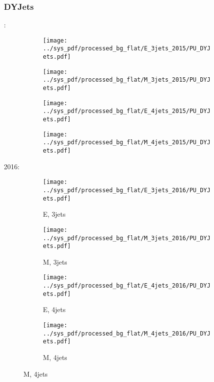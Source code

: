 \documentclass{beamer}
\begin{document}
\begin{frame}
\frametitle{DYJets}
\fontsize{5}{1}:
\begin{figure}
\centering
\begin{subfigure}[b]{0.24\textwidth}
\texttt{[image: ../sys\_pdf/processed\_bg\_flat/E\_3jets\_2015/PU\_DYJets.pdf]}
\end{subfigure}
\begin{subfigure}[b]{0.24\textwidth}
\texttt{[image: ../sys\_pdf/processed\_bg\_flat/M\_3jets\_2015/PU\_DYJets.pdf]}
\end{subfigure}
\begin{subfigure}[b]{0.24\textwidth}
\texttt{[image: ../sys\_pdf/processed\_bg\_flat/E\_4jets\_2015/PU\_DYJets.pdf]}
\end{subfigure}
\begin{subfigure}[b]{0.24\textwidth}
\texttt{[image: ../sys\_pdf/processed\_bg\_flat/M\_4jets\_2015/PU\_DYJets.pdf]}
\end{subfigure}
\end{figure}
2016:
\begin{figure}
\centering
\begin{subfigure}[b]{0.24\textwidth}
\texttt{[image: ../sys\_pdf/processed\_bg\_flat/E\_3jets\_2016/PU\_DYJets.pdf]}
\captionsetup{font=tiny}
\caption{E, 3jets}
\end{subfigure}
\begin{subfigure}[b]{0.24\textwidth}
\texttt{[image: ../sys\_pdf/processed\_bg\_flat/M\_3jets\_2016/PU\_DYJets.pdf]}
\captionsetup{font=tiny}
\caption{M, 3jets}
\end{subfigure}
\begin{subfigure}[b]{0.24\textwidth}
\texttt{[image: ../sys\_pdf/processed\_bg\_flat/E\_4jets\_2016/PU\_DYJets.pdf]}
\captionsetup{font=tiny}
\caption{E, 4jets}
\end{subfigure}
\begin{subfigure}[b]{0.24\textwidth}
\texttt{[image: ../sys\_pdf/processed\_bg\_flat/M\_4jets\_2016/PU\_DYJets.pdf]}
\captionsetup{font=tiny}
\caption{M, 4jets}
\end{subfigure}
\end{figure}
\end{frame}
\end{document}
